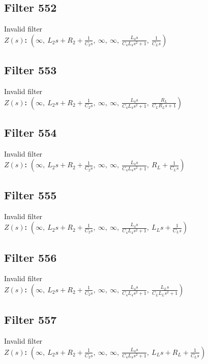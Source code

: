\documentclass{article}
\begin{document}
\subsection*{Filter 552}
Invalid filter \\ 
\textbf{$Z(s)$:} $\left( \infty, \  L_{2} s + R_{2} + \frac{1}{C_{2} s}, \  \infty, \  \infty, \  \frac{L_{4} s}{C_{4} L_{4} s^{2} + 1}, \  \frac{1}{C_{L} s}\right)$ \\ 
\subsection*{Filter 553}
Invalid filter \\ 
\textbf{$Z(s)$:} $\left( \infty, \  L_{2} s + R_{2} + \frac{1}{C_{2} s}, \  \infty, \  \infty, \  \frac{L_{4} s}{C_{4} L_{4} s^{2} + 1}, \  \frac{R_{L}}{C_{L} R_{L} s + 1}\right)$ \\ 
\subsection*{Filter 554}
Invalid filter \\ 
\textbf{$Z(s)$:} $\left( \infty, \  L_{2} s + R_{2} + \frac{1}{C_{2} s}, \  \infty, \  \infty, \  \frac{L_{4} s}{C_{4} L_{4} s^{2} + 1}, \  R_{L} + \frac{1}{C_{L} s}\right)$ \\ 
\subsection*{Filter 555}
Invalid filter \\ 
\textbf{$Z(s)$:} $\left( \infty, \  L_{2} s + R_{2} + \frac{1}{C_{2} s}, \  \infty, \  \infty, \  \frac{L_{4} s}{C_{4} L_{4} s^{2} + 1}, \  L_{L} s + \frac{1}{C_{L} s}\right)$ \\ 
\subsection*{Filter 556}
Invalid filter \\ 
\textbf{$Z(s)$:} $\left( \infty, \  L_{2} s + R_{2} + \frac{1}{C_{2} s}, \  \infty, \  \infty, \  \frac{L_{4} s}{C_{4} L_{4} s^{2} + 1}, \  \frac{L_{L} s}{C_{L} L_{L} s^{2} + 1}\right)$ \\ 
\subsection*{Filter 557}
Invalid filter \\ 
\textbf{$Z(s)$:} $\left( \infty, \  L_{2} s + R_{2} + \frac{1}{C_{2} s}, \  \infty, \  \infty, \  \frac{L_{4} s}{C_{4} L_{4} s^{2} + 1}, \  L_{L} s + R_{L} + \frac{1}{C_{L} s}\right)$ \\ 
\end{document}
